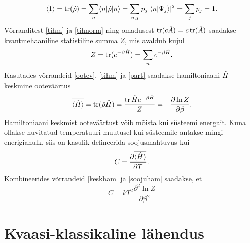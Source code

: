 \documentclass{trkut}%
\DeclareMathOperator{\tr}{tr}
\renewcommand\braket[1]{\langle{#1}\rangle}
\begin{document}
\begin{equation}
    \braket{1}=\tr(\op{\rho})=\sum_n \braket{n|\op{\rho}|n}=\sum_{n, j} p_j |\braket{n| \Psi_j}|^2=\sum_j p_j=1.
    \label{tihnorm}
\end{equation}
Võrranditest \eqref{tihm} ja \eqref{tihnorm} ning omadusest $\tr(c\op{A})=c\tr(\op{A})$ saadakse kvantmehaaniline statistiline summa $Z$, mis avaldub kujul
\begin{equation}
    Z=\tr(e^{-\beta \op{H}})=\sum_n e^{-\beta \op{H}}.
    \label{part}
\end{equation}
Kasutades võrrandeid \eqref{ootev}, \eqref{tihm} ja \eqref{part} saadakse hamiltoniaani $\op{H}$ keskmine ooteväärtus
\begin{equation}
    \overline{\braket{\op{H}}}=\tr(\op{\rho}\op{H})=\frac{\tr{\op{H}e^{-\beta \op{H}}}}{Z}= -\frac{\partial \ln Z}{\partial \beta}.
    \label{keskham}
\end{equation}
Hamiltoniaani keskmist ooteväärtust võib mõista kui süsteemi energait. Kuna ollakse huvitatud temperatuuri muutusel kui süsteemile antakse mingi enerigiahulk, siis on kasulik defineerida soojusmahtuvus kui
\begin{equation}
    C = \frac{\partial \overline{\braket{\op{H}}}}{\partial T}.
    \label{soojuham}
\end{equation}
Kombineerides võrrandeid \eqref{keskham} ja \eqref{soojuham} saadakse, et
\begin{equation}
    C = k T^2 \frac{\partial^2 \ln Z}{\partial \beta^2}
    \label{mahtuvus}
\end{equation}


\section{Kvaasi-klassikaline lähendus}
\end{document}
